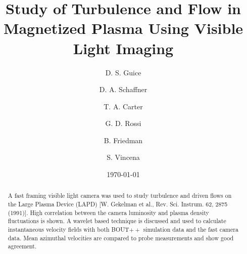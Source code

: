 \documentclass[%
 reprint,
 amsmath,amssymb,
 aps,
]{revtex4-1}
\begin{document}

\title{Study of Turbulence and Flow in Magnetized Plasma Using Visible Light Imaging}

\author{D. S. Guice}
\author{D. A. Schaffner}
\author{T. A. Carter}
\author{G. D. Rossi}
\author{B. Friedman}
\author{S. Vincena}
 
%


\date{\today}%
            

\begin{abstract}
A fast framing visible light camera was used to study turbulence and driven flows on the Large Plasma Device (LAPD) [W. Gekelman et al., Rev. Sci. Instrum. 62, 2875 (1991)]. High correlation between the camera luminosity and plasma density fluctuations is shown. A wavelet based technique is discussed and used to calculate instantaneous velocity fields with both BOUT$++$ simulation data and the fast camera data. Mean azimuthal velocities are compared to probe measurements and show good agreement.
\end{abstract}

\maketitle

\end{document}
